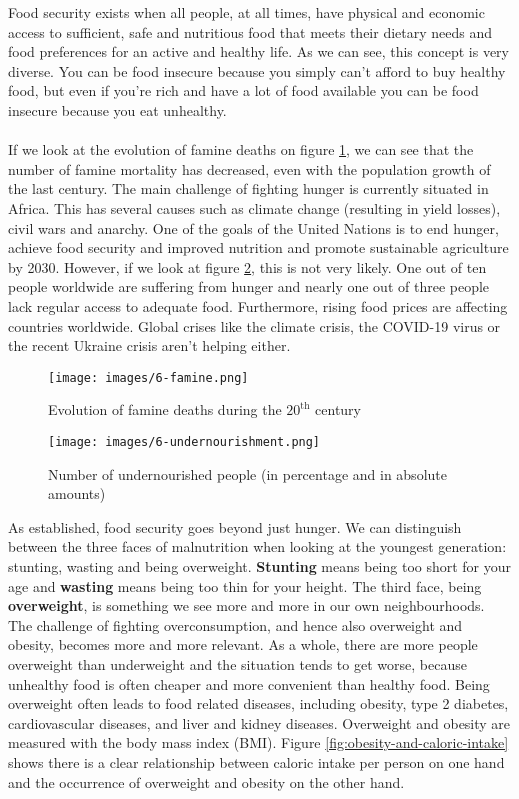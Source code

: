 \documentclass[../summary.tex]{subfiles}
\begin{document}
Food security exists when all people, at all times, have physical and economic access to sufficient, safe and nutritious food that meets their dietary needs and food preferences for an active and healthy life. As we can see, this concept is very diverse. You can be food insecure because you simply can't afford to buy healthy food, but even if you're rich and have a lot of food available you can be food insecure because you eat unhealthy.
\\\\
If we look at the evolution of famine deaths on figure \ref{fig:famine}, we can see that the number of famine mortality has decreased, even with the population growth of the last century. The main challenge of fighting hunger is currently situated in Africa. This has several causes such as climate change (resulting in yield losses), civil wars and anarchy. One of the goals of the United Nations is to end hunger, achieve food security and improved nutrition and promote sustainable agriculture by 2030. However, if we look at figure \ref{fig:undernourishment}, this is not very likely. One out of ten people worldwide are suffering from hunger and nearly one out of three people lack regular access to adequate food. Furthermore, rising food prices are affecting countries worldwide. Global crises like the climate crisis, the COVID-19 virus or the recent Ukraine crisis aren't helping either.

\begin{figure}[htbp]
	\centering
	\texttt{[image: images/6-famine.png]}
	\caption{Evolution of famine deaths during the $\mathrm{20^{th}}$ century}
	\label{fig:famine}
\end{figure}

\begin{figure}[htbp]
	\centering
	\texttt{[image: images/6-undernourishment.png]}
	\caption{Number of undernourished people (in percentage and in absolute amounts)}
	\label{fig:undernourishment}
\end{figure}

As established, food security goes beyond just hunger. We can distinguish between the three faces of malnutrition when looking at the youngest generation: stunting, wasting and being overweight.
\textbf{Stunting} means being too short for your age and \textbf{wasting} means being too thin for your height. The third face, being \textbf{overweight}, is something we see more and more in our own neighbourhoods. The challenge of fighting overconsumption, and hence also overweight and obesity, becomes more and more relevant. As a whole, there are more people overweight than underweight and the situation tends to get worse, because unhealthy food is often cheaper and more convenient than healthy food. Being overweight often leads to food related diseases, including obesity, type 2 diabetes, cardiovascular diseases, and liver and kidney diseases. Overweight and obesity are measured with the body mass index (BMI). Figure \ref{fig:obesity-and-caloric-intake} shows there is a clear relationship between caloric intake per person on one hand and the occurrence of overweight and obesity on the other hand.
\end{document}
